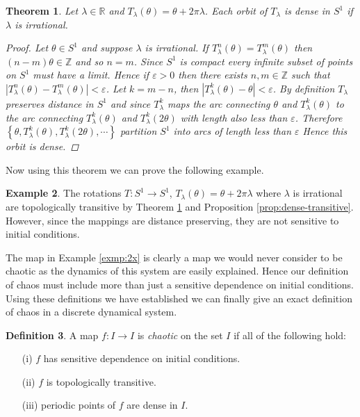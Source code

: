 \documentclass[11pt,a4paper,oneside]{memoir}
\theoremstyle{plain}
\newtheorem{thm}{Theorem}[chapter]
\theoremstyle{definition}
\newtheorem{defn}[thm]{Definition}
\newtheorem{exmp}[thm]{Example}
\begin{document}
\begin{thm} \label{thm:s1irrational}
    Let $\lambda \in \mathbb{R}$ and $T_\lambda(\theta) = \theta + 2\pi \lambda$. Each orbit of $T_\lambda$ is dense in $S^1$ if $\lambda$ is irrational.
    \begin{proof}
        Let $\theta \in S^1$ and suppose $\lambda$ is irrational. If $T_\lambda^n(\theta) = T_\lambda^m(\theta)$ then $(n - m)\theta \in \mathbb{Z}$ and so $n = m$. Since $S^1$ is compact every infinite subset of points on $S^1$ must have a limit. Hence if $\varepsilon > 0$ then there exists $n, m \in \mathbb{Z}$ such that $\left\lvert T_\lambda^n(\theta) - T_\lambda^m(\theta) \right\rvert < \varepsilon$. Let $k = m - n$, then $\left\lvert T_\lambda^k(\theta) - \theta \right\rvert < \varepsilon$. By definition $T_\lambda$ preserves distance in $S^1$ and since $T_\lambda^k$ maps the arc connecting $\theta$ and $T_\lambda^k(\theta)$ to the arc connecting $T_\lambda^k(\theta)$ and $T_\lambda^k(2 \theta)$ with length also less than $\varepsilon$. Therefore $\left\lbrace \theta, T_\lambda^k(\theta), T_\lambda^k(2 \theta), \cdots \right\rbrace$ partition $S^1$ into arcs of length less than $\varepsilon$ Hence this orbit is dense.
    \end{proof}
\end{thm}

Now using this theorem we can prove the following example.
\begin{exmp}
    The rotations $T: S^1 \to S^1$, $T_\lambda(\theta) = \theta + 2\pi \lambda$ where $\lambda$ is irrational are topologically transitive by Theorem \ref{thm:s1irrational} and Proposition \ref{prop:dense-transitive}. However, since the mappings are distance preserving, they are not sensitive to initial conditions.
\end{exmp}


The map in Example \ref{exmp:2x} is clearly a map we would never consider to be chaotic as the dynamics of this system are easily explained. Hence our definition of chaos must include more than just a sensitive dependence on initial conditions. Using these definitions we have established we can finally give an exact definition of chaos in a discrete dynamical system.

\begin{defn}
    A map $f: I \to I$ is \emph{chaotic} on the set $I$ if all of the following hold:
    \begin{itemize}
        \item[(i)]$f$ has sensitive dependence on initial conditions.
        \item[(ii)]$f$ is topologically transitive.
        \item[(iii)]periodic points of $f$ are dense in $I$.
    \end{itemize}
\end{defn}
\end{document}
